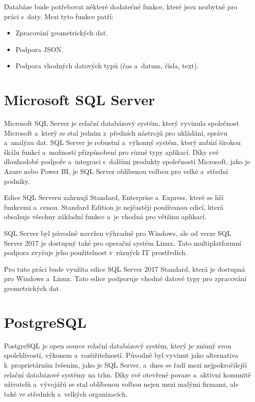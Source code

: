 Databáze bude potřebovat některé dodatečné funkce, které jsou nezbytné pro práci s~daty.
Mezi tyto funkce patří:
\begin{itemize}
    \item Zpracování geometrických dat.
    \item Podpora JSON.
    \item Podpora vhodných datových typů (čas a~datum, čísla, text).
\end{itemize}

\section{Microsoft SQL Server}
Microsoft SQL Server je relační databázový systém, který vyvinula společnost 
Microsoft a~který se stal jedním z~předních nástrojů pro ukládání, správu a~analýzu dat. 
SQL Server je robustní a~výkonný systém, který nabízí širokou škálu funkcí 
a~možností přizpůsobení pro různé typy aplikací. Díky své dlouhodobé podpoře a~integraci 
s~dalšími produkty společnosti Microsoft, jako je Azure nebo Power BI, je SQL Server 
oblíbenou volbou pro velké a~střední podniky.

Edice SQL Serveru zahrnují Standard, Enterprise a~Express, 
které se liší funkcemi a~cenou. Standard Edition je nejčastěji používanou edicí, 
která obsahuje všechny základní funkce a~je vhodná pro většinu aplikací.

SQL Server byl původně navržen výhradně pro Windows, ale od verze SQL Server 2017 je dostupný 
také pro operační systém Linux. Tato multiplatformní podpora zvyšuje jeho použitelnost 
v~různých IT prostředích.
\cite{microsoft_sql_server}

Pro tuto práci bude využita edice SQL Server 2017 Standard, která je dostupná pro Windows a~Linux.
Tato edice podporuje vhodné datové typy pro zpracování geometrických dat.

\section{PostgreSQL}
PostgreSQL je open source relační databázový systém, který je známý svou spolehlivostí, výkonem 
a~rozšiřitelností. Původně byl vyvinut jako alternativa k~proprietárním řešením, jako je SQL Server, 
a~dnes se řadí mezi nejpokročilejší relační databázové systémy na trhu. Díky své otevřené povaze 
a~aktivní komunitě uživatelů a~vývojářů se stal oblíbenou volbou nejen mezi malými firmami, 
ale také ve středních a~velkých organizacích.

